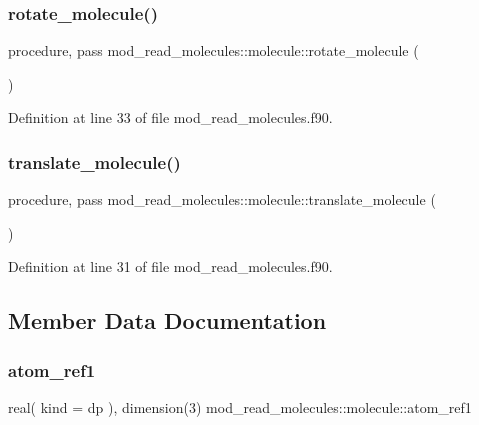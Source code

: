 \subsubsection{\texorpdfstring{rotate\+\_\+molecule()}{rotate\_molecule()}}
{\footnotesize\ttfamily procedure, pass mod\+\_\+read\+\_\+molecules\+::molecule\+::rotate\+\_\+molecule (\begin{DoxyParamCaption}{ }\end{DoxyParamCaption})}



Definition at line 33 of file mod\+\_\+read\+\_\+molecules.\+f90.

\mbox{\label{structmod__read__molecules_1_1molecule_a053396d1f476f293e513724be4e6d87e}} 
\subsubsection{\texorpdfstring{translate\+\_\+molecule()}{translate\_molecule()}}
{\footnotesize\ttfamily procedure, pass mod\+\_\+read\+\_\+molecules\+::molecule\+::translate\+\_\+molecule (\begin{DoxyParamCaption}{ }\end{DoxyParamCaption})}



Definition at line 31 of file mod\+\_\+read\+\_\+molecules.\+f90.



\subsection{Member Data Documentation}
\mbox{\label{structmod__read__molecules_1_1molecule_aafb248ca2fd25241037a09bb54c0caec}} 
\subsubsection{\texorpdfstring{atom\+\_\+ref1}{atom\_ref1}}
{\footnotesize\ttfamily real( kind = dp ), dimension(3) mod\+\_\+read\+\_\+molecules\+::molecule\+::atom\+\_\+ref1}



